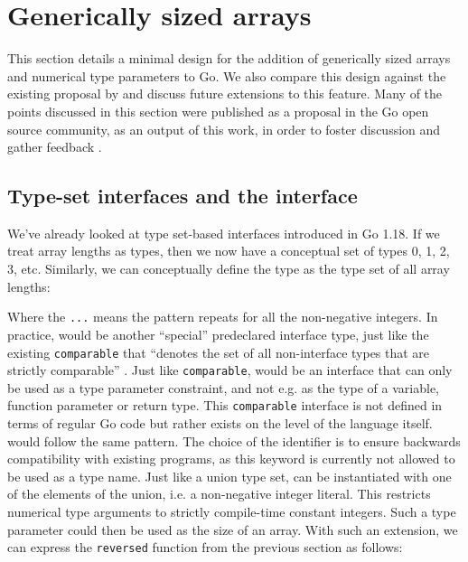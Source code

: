 \section{Generically sized arrays}
\label{ch:proposal}

This section details a minimal design for the addition of generically sized
arrays and numerical type parameters to Go. We also compare this design against
the existing proposal by \autocite{goArrayProposal} and discuss future
extensions to this feature. Many of the points discussed in this section were
published as a proposal in the Go open source community, as an output of this
work, in order to foster discussion and gather feedback \autocite{myProposal}.

\subsection{Type-set interfaces and the  interface}

We've already looked at type set-based interfaces introduced in Go 1.18. If we
treat array lengths as types, then we now have a conceptual set of types 0, 1, 2,
3, etc. Similarly, we can conceptually define the  type as the type
set of all array lengths:


Where the \texttt{...} means the pattern repeats for all the non-negative
integers. In practice,  would be another ``special'' predeclared
interface type, just like the existing \texttt{comparable} that ``denotes the
set of all non-interface types that are strictly comparable'' \autocite{spec}.
Just like \texttt{comparable},  would be an interface that can only be
used as a type parameter constraint, and not e.g. as the type of a variable,
function parameter or return type. This \texttt{comparable} interface is not
defined in terms of regular Go code but rather exists on the level of the
language itself.  would follow the same pattern. The choice of the
identifier  is to ensure backwards compatibility with existing
programs, as this keyword is currently not allowed to be used as a type name.
Just like a union type set,  can be instantiated with one of the
elements of the union, i.e. a non-negative integer literal. This restricts
numerical type arguments to strictly compile-time constant integers. Such a type
parameter could then be used as the size of an array. With such an extension, we
can express the \texttt{reversed} function from the previous section as follows:

